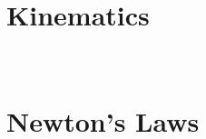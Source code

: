 \documentclass[english,twoside]{labmanual} %
\begin{document}


\tableofcontents{}

\part{Kinematics}
\














\part{Newton's Laws}
\









\end{document}
